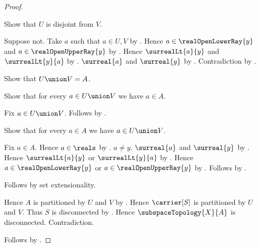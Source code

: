 \begin{proof}
\begin{subproof}
        Show that $U$ is disjoint from $V$.
        \begin{subproof}
            Suppose not.
            Take $a$ such that $a\in U,V$ by .
            Hence $a\in\realOpenLowerRay{y}$ and
                $a\in\realOpenUpperRay{y}$ by .
            Hence $\surrealLt{a}{y}$ and $\surrealLt{y}{a}$ by
                .
            $\surreal{a}$ and $\surreal{y}$ by
                .
            Contradiction by .
        \end{subproof}
        Show that $U\union V=A$.
        \begin{subproof}
            Show that for every $a\in U\union V$ we have $a\in A$.
            \begin{subproof}
                Fix $a\in U\union V$.
                Follows by .
            \end{subproof}
            Show that for every $a\in A$ we have $a\in U\union V$.
            \begin{subproof}
                Fix $a\in A$.
                Hence $a\in\reals$ by .
                $a\neq y$.
                $\surreal{a}$ and $\surreal{y}$ by
                    .
                Hence $\surrealLt{a}{y}$ or
                    $\surrealLt{y}{a}$ by
                    .
                Hence $a\in\realOpenLowerRay{y}$ or
                    $a\in\realOpenUpperRay{y}$ by
                    .
                Follows by .
            \end{subproof}
            Follows by set extensionality.
        \end{subproof}
        Hence $A$ is partitioned by $U$ and $V$ by \auto.
        Hence $\carrier[S]$ is partitioned by $U$ and $V$.
        Thus $S$ is disconnected by .
        Hence $\subspaceTopology{X}{A}$ is disconnected.
        Contradiction.
    \end{subproof}
    Follows by .
\end{proof}

